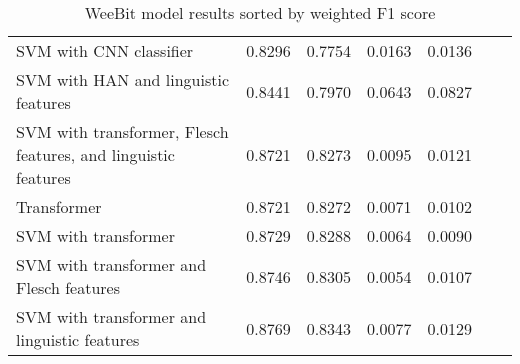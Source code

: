 \documentclass[11pt,a4paper]{article}
\theoremstyle{definition}
\begin{document}
\begin{table}
{\begin{tabular}{p{7cm}p{1.5cm}p{1.5cm}p{1.5cm}p{1.5cm}p{1.5cm}p{1.5cm}}
SVM with CNN classifier & 0.8296 & 0.7754 & 0.0163 & 0.0136 \\
SVM with HAN and linguistic features & 0.8441 & 0.7970 & 0.0643 & 0.0827 \\
SVM with transformer, Flesch features, and linguistic features & 0.8721 & 0.8273 & 0.0095 & 0.0121 \\
Transformer & 0.8721 & 0.8272 & 0.0071 & 0.0102 \\
SVM with transformer & 0.8729 & 0.8288 & 0.0064 & 0.0090 \\
SVM with transformer and Flesch features & 0.8746 & 0.8305 & 0.0054 & 0.0107 \\
SVM with transformer and linguistic features & 0.8769 & 0.8343 & 0.0077 & 0.0129
\end{tabular}
} \caption{WeeBit model results sorted by weighted F1 score}
\end{table}
\end{document}
